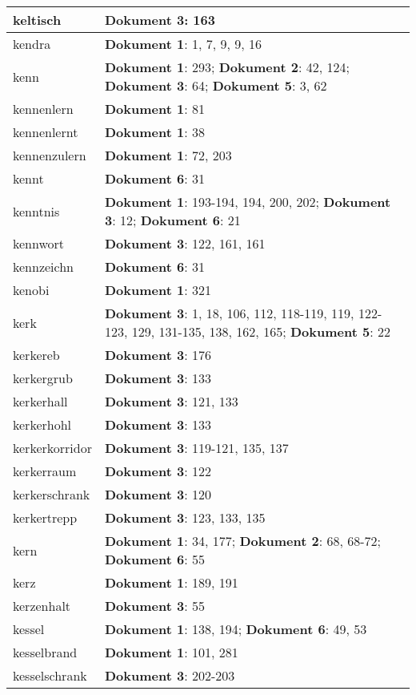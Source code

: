 \documentclass[a5paper]{article}
\begin{document}
\begin{longtable}[l]{|l|p{3in}|}
\hline
keltisch & \textbf{Dokument 3}: 163 \\
\hline
kendra & \textbf{Dokument 1}: 1, 7, 9, 9, 16 \\
\hline
kenn & \textbf{Dokument 1}: 293; \textbf{Dokument 2}: 42, 124; \textbf{Dokument 3}: 64; \textbf{Dokument 5}: 3, 62 \\
\hline
kennenlern & \textbf{Dokument 1}: 81 \\
\hline
kennenlernt & \textbf{Dokument 1}: 38 \\
\hline
kennenzulern & \textbf{Dokument 1}: 72, 203 \\
\hline
kennt & \textbf{Dokument 6}: 31 \\
\hline
kenntnis & \textbf{Dokument 1}: 193-194, 194, 200, 202; \textbf{Dokument 3}: 12; \textbf{Dokument 6}: 21 \\
\hline
kennwort & \textbf{Dokument 3}: 122, 161, 161 \\
\hline
kennzeichn & \textbf{Dokument 6}: 31 \\
\hline
kenobi & \textbf{Dokument 1}: 321 \\
\hline
kerk & \textbf{Dokument 3}: 1, 18, 106, 112, 118-119, 119, 122-123, 129, 131-135, 138, 162, 165; \textbf{Dokument 5}: 22 \\
\hline
kerkereb & \textbf{Dokument 3}: 176 \\
\hline
kerkergrub & \textbf{Dokument 3}: 133 \\
\hline
kerkerhall & \textbf{Dokument 3}: 121, 133 \\
\hline
kerkerhohl & \textbf{Dokument 3}: 133 \\
\hline
kerkerkorridor & \textbf{Dokument 3}: 119-121, 135, 137 \\
\hline
kerkerraum & \textbf{Dokument 3}: 122 \\
\hline
kerkerschrank & \textbf{Dokument 3}: 120 \\
\hline
kerkertrepp & \textbf{Dokument 3}: 123, 133, 135 \\
\hline
kern & \textbf{Dokument 1}: 34, 177; \textbf{Dokument 2}: 68, 68-72; \textbf{Dokument 6}: 55 \\
\hline
kerz & \textbf{Dokument 1}: 189, 191 \\
\hline
kerzenhalt & \textbf{Dokument 3}: 55 \\
\hline
kessel & \textbf{Dokument 1}: 138, 194; \textbf{Dokument 6}: 49, 53 \\
\hline
kesselbrand & \textbf{Dokument 1}: 101, 281 \\
\hline
kesselschrank & \textbf{Dokument 3}: 202-203 \\

\end{longtable}
\end{document}

